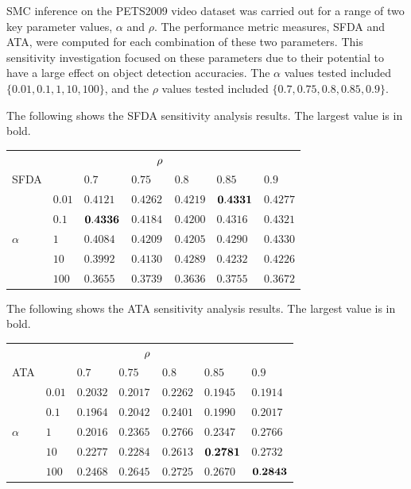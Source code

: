 \documentclass[smallcondensed, final]{svjour3}
\begin{document}
SMC inference on the PETS2009 video dataset was carried out for a range of two key parameter values, $\alpha$ and $\rho$. The performance metric measures, SFDA and ATA, were computed for each combination of these two parameters. This sensitivity investigation focused on these parameters due to their potential to have a large effect on object detection accuracies. The $\alpha$ values tested included $\{ 0.01, 0.1, 1, 10, 100 \}$, and the $\rho$ values tested included $\{ 0.7, 0.75, 0.8, 0.85, 0.9 \}$.

The following shows the SFDA sensitivity analysis results. The largest value is in bold.
\begin{center}
\begin{tabular}[!]{l l  l  l  l  l  l}
  & & & $\hspace{8mm}\rho$ & & & \\
  SFDA  &  	& $0.7$ & $0.75$ & $0.8$ & $0.85$ & $0.9$  \\  
  &$0.01$ 	& $0.4121$ & $0.4262$ & $0.4219$ & $\bold{0.4331}$ & $0.4277$  \\
  &$0.1$  	& $\bold{0.4336}$ & $0.4184$ & $0.4200$ & $0.4316$ & $0.4321$  \\ 
$\alpha$ 	& $1$    & $0.4084$ & $0.4209$ & $0.4205$ & $0.4290$ & $0.4330$  \\  
  &$10$   	& $0.3992$ & $0.4130$ & $0.4289$ & $0.4232$ & $0.4226$  \\  
  &$100$  	& $0.3655$ & $0.3739$ & $0.3636$ & $0.3755$ & $0.3672$  \\
\end{tabular}
\end{center}

The following shows the ATA sensitivity analysis results. The largest value is in bold.
\begin{center}
\begin{tabular}[!]{l l  l  l  l  l  l}
		& & & $\hspace{8mm}\rho$ & & & \\
 	 ATA  & 	 	& $0.7$ & $0.75$ & $0.8$ & $0.85$ & $0.9$  \\  
	  &$0.01$ 		& $0.2032$ & $0.2017$ & $0.2262$ & $0.1945$ & $0.1914$  \\
		  &$0.1$ 	& $0.1964$ & $0.2042$ & $0.2401$ & $0.1990$ & $0.2017$  \\
$\alpha$ & $1$  	& $0.2016$ & $0.2365$ & $0.2766$ & $0.2347$ & $0.2766$  \\   
  		&$10$   	& $0.2277$ & $0.2284$ & $0.2613$ & $\bold{0.2781}$ & $0.2732$  \\  
 		 &$100$ 	& $0.2468$ & $0.2645$ & $0.2725$ & $0.2670$ & $\bold{0.2843}$  \\
\end{tabular}
\end{center}
\end{document}
